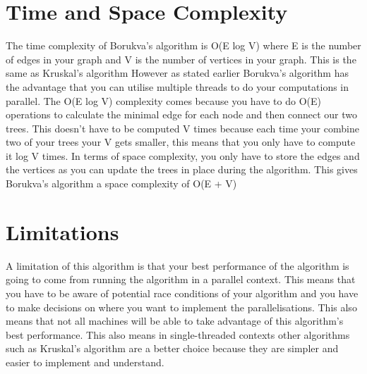 \documentclass{report}
\begin{document}
\section{Time and Space Complexity}
The time complexity of Borukva's algorithm is O(E log V) where E is the number of edges in your graph and V is the number of vertices in your graph. This is the same as Kruskal's algorithm However as stated earlier Borukva's algorithm has the advantage that you can utilise multiple threads to do your computations in parallel.
The O(E log V) complexity comes because you have to do O(E) operations to calculate the minimal edge for each node and then connect our two trees. This doesn't have to be computed V times because each time your combine two of your trees your V gets smaller, this means that you only have to compute it log V times.
In terms of space complexity, you only have to store the edges and the vertices as you can update the trees in place during the algorithm. This gives Borukva's algorithm a space complexity of O(E + V)

\section{Limitations}
A limitation of this algorithm is that your best performance of the algorithm is going to come from running the algorithm in a parallel context. This means that you have to be aware of potential race conditions of your algorithm and you have to make decisions on where you want to implement the parallelisations. This also means that not all machines will be able to take advantage of this algorithm's best performance. This also means in single-threaded contexts other algorithms such as Kruskal's algorithm are a better choice because they are simpler and easier to implement and understand.
\end{document}
